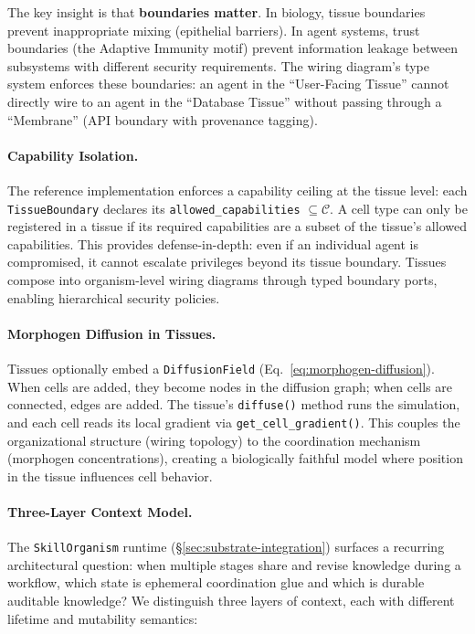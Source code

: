 The key insight is that \textbf{boundaries matter}. In biology, tissue boundaries prevent inappropriate mixing
(epithelial barriers). In agent systems, trust boundaries (the Adaptive Immunity motif) prevent information
leakage between subsystems with different security requirements. The wiring diagram's type system enforces
these boundaries: an agent in the ``User-Facing Tissue'' cannot directly wire to an agent in the ``Database
Tissue'' without passing through a ``Membrane'' (API boundary with provenance tagging).

\paragraph{Capability Isolation.}
The reference implementation enforces a capability ceiling at the tissue level: each \texttt{TissueBoundary} declares its \texttt{allowed\_capabilities} $\subseteq \mathcal{C}$. A cell type can only be registered in a tissue if its required capabilities are a subset of the tissue's allowed capabilities. This provides defense-in-depth: even if an individual agent is compromised, it cannot escalate privileges beyond its tissue boundary. Tissues compose into organism-level wiring diagrams through typed boundary ports, enabling hierarchical security policies.

\paragraph{Morphogen Diffusion in Tissues.}
Tissues optionally embed a \texttt{DiffusionField} (Eq.~\eqref{eq:morphogen-diffusion}). When cells are added, they become nodes in the diffusion graph; when cells are connected, edges are added. The tissue's \texttt{diffuse()} method runs the simulation, and each cell reads its local gradient via \texttt{get\_cell\_gradient()}. This couples the organizational structure (wiring topology) to the coordination mechanism (morphogen concentrations), creating a biologically faithful model where position in the tissue influences cell behavior.

\paragraph{Three-Layer Context Model.}
\label{par:three-layer-context}
The \texttt{SkillOrganism} runtime (\S\ref{sec:substrate-integration}) surfaces a recurring architectural question: when multiple stages share and revise knowledge during a workflow, which state is ephemeral coordination glue and which is durable auditable knowledge? We distinguish three layers of context, each with different lifetime and mutability semantics:

